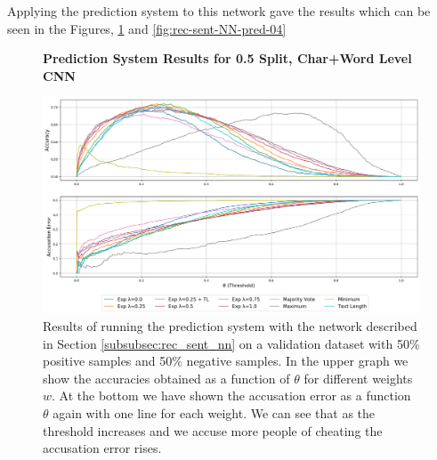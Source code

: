Applying the prediction system to this network gave the results which
can be seen in the Figures, \ref{fig:rec-sent-NN-pred-50} and \ref{fig:rec-sent-NN-pred-04}

\begin{figure}
    \centering
    \textbf{Prediction System Results for 0.5 Split, Char+Word Level CNN}\par\medskip
    \includegraphics[scale=0.35]{./pictures/experiments/rec_sent_nn/pred_50_rnn.png}
    \caption{Results of running the prediction system with the network described
        in Section \ref{subsubsec:rec_sent_nn} on a validation dataset
        with 50\% positive samples and 50\% negative samples. In the upper graph
        we show the accuracies obtained as a function of $\theta$ for different
        weights $w$. At the bottom we have shown the accusation error as a
        function $\theta$ again with one line for each weight. We can see that
        as the threshold increases and we accuse more people of cheating the
        accusation error rises.}
    \label{fig:rec-sent-NN-pred-50}
\end{figure}

